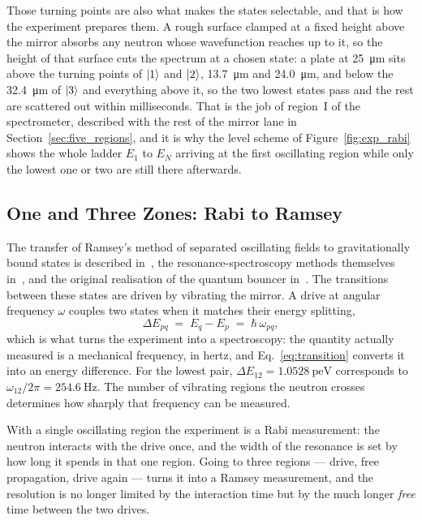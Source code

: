 \documentclass[a4paper,headsepline,oneside,11pt]{scrartcl}
\begin{document}
Those turning points are also what makes the states selectable, and that is how
the experiment prepares them. A rough surface clamped at a fixed height above the
mirror absorbs any neutron whose wavefunction reaches up to it, so the height of
that surface cuts the spectrum at a chosen state: a plate at
\SI{25}{\micro\metre} sits above the turning points of $\ket{1}$ and $\ket{2}$,
\SI{13.7}{\micro\metre} and \SI{24.0}{\micro\metre}, and below the
\SI{32.4}{\micro\metre} of $\ket{3}$ and everything above it, so the two lowest
states pass and the rest are scattered out within milliseconds. That is the job
of region~I of the spectrometer, described with the rest of the mirror lane in
Section~\ref{sec:five_regions}, and it is why the level scheme of
Figure~\ref{fig:exp_rabi} shows the whole ladder $E_1$ to $E_N$ arriving at the
first oscillating region while only the lowest one or two are still there
afterwards.

\subsection{One and Three Zones: Rabi to Ramsey}
\label{sec:probe_experiments}
The transfer of Ramsey's method of separated oscillating fields to
gravitationally bound states is described in~\cite{Abele2010}, the
resonance-spectroscopy methods themselves in~\cite{Cronenberg2012}, and the
original realisation of the quantum bouncer in~\cite{Jenke2011thesis}.
The transitions between these states are driven by vibrating the mirror. A
drive at angular frequency $\omega$ couples two states when it matches their
energy splitting,
%
\begin{equation}
  \Delta E_{pq} \;=\; E_q - E_p \;=\; \hbar\,\omega_{pq},
  \label{eq:transition}
\end{equation}
%
which is what turns the experiment into a spectroscopy: the quantity actually
measured is a mechanical frequency, in hertz, and Eq.~\eqref{eq:transition}
converts it into an energy difference. For the lowest pair,
$\Delta E_{12} = \SI{1.0528}{\pico\electronvolt}$ corresponds to $\omega_{12}/2\pi = \SI{254.6}{\hertz}$.
The number of vibrating regions the neutron crosses determines how sharply that
frequency can be measured.

With a single oscillating region the experiment is a Rabi measurement: the
neutron interacts with the drive once, and the width of the resonance is set by
how long it spends in that one region. Going to three regions --- drive, free
propagation, drive again --- turns it into a Ramsey measurement, and the
resolution is no longer limited by the interaction time but by the much longer
\emph{free} time between the two drives.
\end{document}
